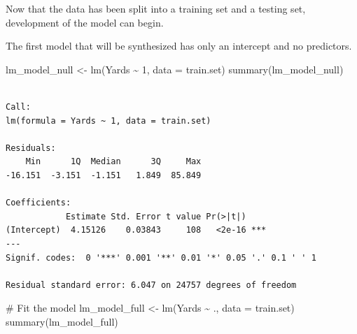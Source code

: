 \documentclass[
  super,
  preprint,
  3p]{elsarticle}
\newenvironment{Shaded}{\begin{snugshade}}{\end{snugshade}}
\newcommand{\AttributeTok}[1]{\textcolor[rgb]{0.40,0.45,0.13}{#1}}
\newcommand{\CommentTok}[1]{\textcolor[rgb]{0.37,0.37,0.37}{#1}}
\newcommand{\DecValTok}[1]{\textcolor[rgb]{0.68,0.00,0.00}{#1}}
\newcommand{\FunctionTok}[1]{\textcolor[rgb]{0.28,0.35,0.67}{#1}}
\newcommand{\NormalTok}[1]{\textcolor[rgb]{0.00,0.23,0.31}{#1}}
\newcommand{\OtherTok}[1]{\textcolor[rgb]{0.00,0.23,0.31}{#1}}
\newcommand{\SpecialCharTok}[1]{\textcolor[rgb]{0.37,0.37,0.37}{#1}}
\begin{document}
Now that the data has been split into a training set and a testing set,
development of the model can begin.

The first model that will be synthesized has only an intercept and no
predictors.

\begin{Shaded}
\begin{Highlighting}[]
\NormalTok{lm\_model\_null }\OtherTok{\textless{}{-}} \FunctionTok{lm}\NormalTok{(Yards }\SpecialCharTok{\textasciitilde{}} \DecValTok{1}\NormalTok{, }\AttributeTok{data =}\NormalTok{ train.set)}
\FunctionTok{summary}\NormalTok{(lm\_model\_null)}
\end{Highlighting}
\end{Shaded}

\begin{verbatim}

Call:
lm(formula = Yards ~ 1, data = train.set)

Residuals:
    Min      1Q  Median      3Q     Max 
-16.151  -3.151  -1.151   1.849  85.849 

Coefficients:
            Estimate Std. Error t value Pr(>|t|)    
(Intercept)  4.15126    0.03843     108   <2e-16 ***
---
Signif. codes:  0 '***' 0.001 '**' 0.01 '*' 0.05 '.' 0.1 ' ' 1

Residual standard error: 6.047 on 24757 degrees of freedom
\end{verbatim}

\begin{Shaded}
\begin{Highlighting}[]
\CommentTok{\# Fit the model}
\NormalTok{lm\_model\_full }\OtherTok{\textless{}{-}} \FunctionTok{lm}\NormalTok{(Yards }\SpecialCharTok{\textasciitilde{}}\NormalTok{ ., }\AttributeTok{data =}\NormalTok{ train.set)}
\FunctionTok{summary}\NormalTok{(lm\_model\_full)}
\end{Highlighting}
\end{Shaded}
\end{document}
